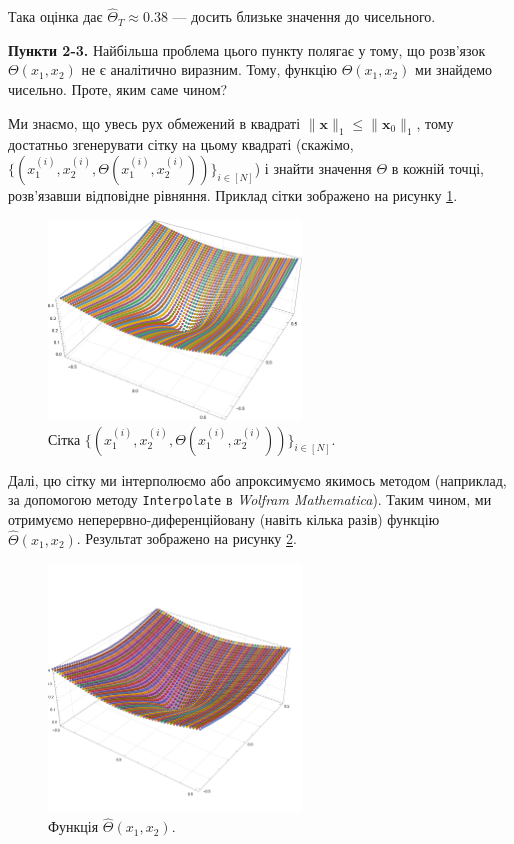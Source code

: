 \documentclass{hw_template}
\begin{document}
Така оцінка дає $\hat{\Theta}_T \approx 0.38$ --- досить близьке значення до чисельного.

\textbf{Пункти 2-3.} Найбільша проблема цього пункту полягає у тому, що розв'язок
$\Theta(x_1,x_2)$ не є аналітично виразним. Тому, функцію $\Theta(x_1,x_2)$ ми знайдемо
чисельно. Проте, яким саме чином?

Ми знаємо, що увесь рух обмежений в квадраті $\|\mathbf{x}\|_1 \leq
\|\mathbf{x}_0\|_1$, тому достатньо згенерувати сітку на цьому квадраті
(скажімо, $\{(x_1^{(i)},x_2^{(i)},\Theta(x_1^{(i)}, x_2^{(i)}))\}_{i \in [N]}$) і
знайти значення $\Theta$ в кожній точці, розв'язавши відповідне рівняння. Приклад 
сітки зображено на рисунку \ref{fig:grid}.

\begin{figure}[H]
    \centering
    \includegraphics[width=0.6\textwidth]{figures/grid.pdf}
    \caption{Сітка $\{(x_1^{(i)},x_2^{(i)},\Theta(x_1^{(i)}, x_2^{(i)}))\}_{i \in [N]}$.}
    \label{fig:grid}
\end{figure}

Далі, цю сітку ми інтерполюємо або апроксимуємо якимось методом (наприклад, за
допомогою методу \texttt{Interpolate} в \textit{Wolfram Mathematica}). Таким
чином, ми отримуємо неперервно-диференційовану (навіть кілька разів) функцію
$\hat{\Theta}(x_1,x_2)$. Результат зображено на рисунку \ref{fig:theta}.

\begin{figure}[H]
    \centering
    \includegraphics[width=0.6\textwidth]{figures/interpolation.pdf}
    \caption{Функція $\hat{\Theta}(x_1,x_2)$.}
    \label{fig:theta}
\end{figure}
\end{document}

